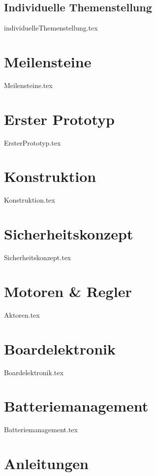 \documentclass[paper=a4,12pt]{scrreprt}
\begin{document}
\section{Individuelle Themenstellung}
{individuelleThemenstellung.tex}

\chapter{Meilensteine}
{Meilensteine.tex}

\chapter{Erster Prototyp}
{ErsterPrototyp.tex}

\chapter{Konstruktion}
{Konstruktion.tex}


\chapter{Sicherheitskonzept}
{Sicherheitskonzept.tex}

\chapter{Motoren \& Regler}
{Aktoren.tex}
\chapter{Boardelektronik}
{Boardelektronik.tex}

\chapter{Batteriemanagement}
{Batteriemanagement.tex}

\chapter{Anleitungen}
\end{document}
